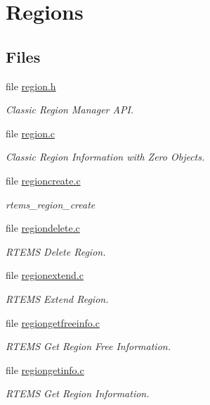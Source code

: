 \hypertarget{group__ClassicRegion}{}\section{Regions}
\label{group__ClassicRegion}
\subsection*{Files}
\begin{DoxyCompactItemize}
\item 
file \mbox{\hyperlink{region_8h}{region.\+h}}
\begin{DoxyCompactList}\small\item\em Classic Region Manager A\+PI. \end{DoxyCompactList}\item 
file \mbox{\hyperlink{region_8c}{region.\+c}}
\begin{DoxyCompactList}\small\item\em Classic Region Information with Zero Objects. \end{DoxyCompactList}\item 
file \mbox{\hyperlink{regioncreate_8c}{regioncreate.\+c}}
\begin{DoxyCompactList}\small\item\em rtems\+\_\+region\+\_\+create \end{DoxyCompactList}\item 
file \mbox{\hyperlink{regiondelete_8c}{regiondelete.\+c}}
\begin{DoxyCompactList}\small\item\em R\+T\+E\+MS Delete Region. \end{DoxyCompactList}\item 
file \mbox{\hyperlink{regionextend_8c}{regionextend.\+c}}
\begin{DoxyCompactList}\small\item\em R\+T\+E\+MS Extend Region. \end{DoxyCompactList}\item 
file \mbox{\hyperlink{regiongetfreeinfo_8c}{regiongetfreeinfo.\+c}}
\begin{DoxyCompactList}\small\item\em R\+T\+E\+MS Get Region Free Information. \end{DoxyCompactList}\item 
file \mbox{\hyperlink{regiongetinfo_8c}{regiongetinfo.\+c}}
\begin{DoxyCompactList}\small\item\em R\+T\+E\+MS Get Region Information. \end{DoxyCompactList}\item 

\end{DoxyCompactItemize}
